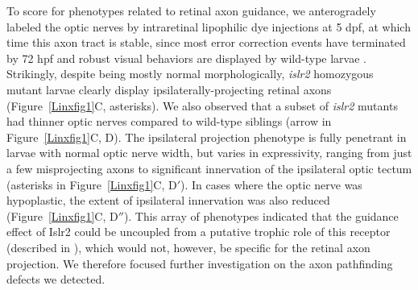 To score for phenotypes related to retinal axon guidance, we anterogradely labeled the optic nerves by intraretinal lipophilic dye injections at 5 dpf, at which time this axon tract is stable, since most error correction events have terminated by 72 hpf \cite{hutson2002pathfinding} and robust visual behaviors are displayed by wild-type larvae \cite{easter1996development,neuhauss2003behavioral}.
Strikingly, despite being mostly normal morphologically, \emph{islr2} homozygous mutant larvae clearly display ipsilaterally-projecting retinal axons (Figure~\ref{Linxfig1}C, asterisks).
We also observed that a subset of \emph{islr2} mutants had thinner optic nerves compared to wild-type siblings (arrow in Figure~\ref{Linxfig1}C, D).
The ipsilateral projection phenotype is fully penetrant in larvae with normal optic nerve width, but varies in expressivity, ranging from just a few misprojecting axons to significant innervation of the ipsilateral optic tectum (asterisks in Figure~\ref{Linxfig1}C, D$'$).
In cases where the optic nerve was hypoplastic, the extent of ipsilateral innervation was also reduced (Figure~\ref{Linxfig1}C, D$''$).
This array of phenotypes indicated that the guidance effect of Islr2 could be uncoupled from a putative trophic role of this receptor (described in ), which would not, however, be specific for the retinal axon projection.
We therefore focused further investigation on the axon pathfinding defects we detected.

